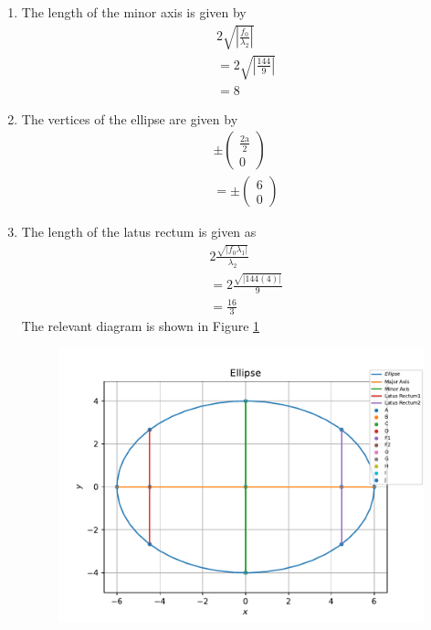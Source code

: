 \documentclass[12pt]{article}
\providecommand{\brak}[1]{\ensuremath{\left(#1\right)}}
\providecommand{\abs}[1]{\left\vert#1\right\vert}
\newcommand{\myvec}[1]{\ensuremath{\begin{pmatrix}#1\end{pmatrix}}}
\begin{document}
\begin{enumerate}
\begin{enumerate}
\item  The length of the minor axis is given by
\begin{align}
	\label{eq:minorLength}
	& 2\sqrt{\abs{\frac{f_0}{\lambda_2}}}\\
	&= 2\sqrt{\abs{\frac{144}{9}}}\\
	&= 8
\end{align}
\item The vertices of the ellipse are given by 
\begin{align}
	& \pm\myvec{\frac{\text{2a}}{2} \\ 0} \\
	&= \pm\myvec{6 \\ 0}
\end{align}
\item The length of the latus rectum is given as 
\begin{align}
	\label{eq:eqLatRectLen}
	& 2\frac{\sqrt{\abs{f_0\lambda_1}}}{\lambda_2} \\
	&= 2\frac{\sqrt{\abs{144\brak{4}}}}{9} \\
	&= \frac{16}{3}
\end{align}
The relevant diagram is shown in Figure \ref{fig:Fig1}
\begin{figure}[!h]
	\begin{center}
		\includegraphics[width=\columnwidth]{./figs/problem1.pdf}
	\end{center}
\caption{}
\label{fig:Fig1}
\end{figure}
\end{enumerate}
\end{enumerate}
\end{document}
